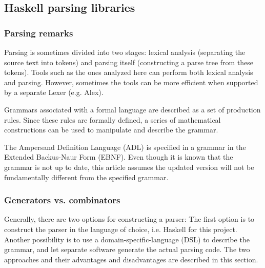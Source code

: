 
\subsection{Haskell parsing libraries}
\label{parsing:libraries}

\subsubsection{Parsing remarks}
%
%
%
Parsing is sometimes divided into two stages: lexical analysis (separating the source text into tokens) and parsing itself (constructing a parse tree from these tokens).
Tools such as the ones analyzed here can perform both lexical analysis and parsing.
However, sometimes the tools can be more efficient when supported by a separate Lexer (e.g. Alex).

Grammars associated with a formal language are described as a set of production rules.
Since these rules are formally defined, a series of mathematical constructions can be used to manipulate and describe the grammar.

%
%
%
The Ampersand Definition Language (ADL) is specified in a grammar in the Extended Backus-Naur Form (EBNF).
Even though it is known that the grammar is not up to date, this article assumes the updated version will not be fundamentally different from the specified grammar.

\subsubsection{Generators vs. combinators}
%
Generally, there are two options for constructing a parser:
The first option is to construct the parser in the language of choice, i.e. Haskell for this project.
Another possibility is to use a domain-specific-language (DSL) to describe the grammar, and let separate software generate the actual parsing code.
The two approaches and their advantages and disadvantages are described in this section.

